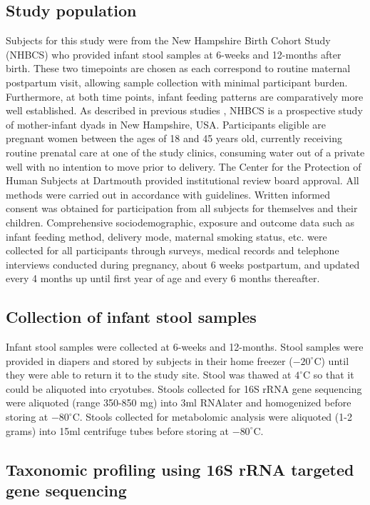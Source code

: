 \subsection{Study population} 

Subjects for this study were from the New Hampshire Birth Cohort Study (NHBCS) who provided infant stool samples at 6-weeks and 12-months after birth. These two timepoints are chosen as each correspond to routine maternal postpartum visit, allowing sample collection with minimal participant burden. Furthermore, at both time points, infant feeding patterns are comparatively more well established. As described in previous studies \cite{madan2016effects, lundgren2018maternal}, NHBCS is a prospective study of mother-infant dyads in New Hampshire, USA. Participants eligible are pregnant women between the ages of 18 and 45 years old, currently receiving routine prenatal care at one of the study clinics, consuming water out of a private well with no intention to move prior to delivery. The Center for the Protection of Human Subjects at Dartmouth provided institutional review board approval. All methods were carried out in accordance with guidelines. Written informed consent was obtained for participation from all subjects for themselves and their children. Comprehensive sociodemographic, exposure and outcome data such as infant feeding method, delivery mode, maternal smoking status, etc. were collected for all participants through surveys, medical records and telephone interviews conducted during pregnancy, about 6 weeks postpartum, and updated every 4 months up until first year of age and every 6 months thereafter. 

\subsection{Collection of infant stool samples}

Infant stool samples were collected at 6-weeks and 12-months. Stool samples were provided in diapers and stored by subjects in their home freezer ($-20^{\circ}$C) until they were able to return it to the study site.  Stool was thawed at $4^{\circ}$C so that it could be aliquoted into cryotubes. Stools collected for 16S rRNA gene sequencing were aliquoted (range 350-850 mg) into 3ml RNAlater and homogenized before storing at $-80^{\circ}$C.  Stools collected for metabolomic analysis were aliquoted (1-2 grams) into 15ml centrifuge tubes before storing at $-80 ^{\circ}$C.

\subsection{Taxonomic profiling using 16S rRNA targeted gene sequencing}


